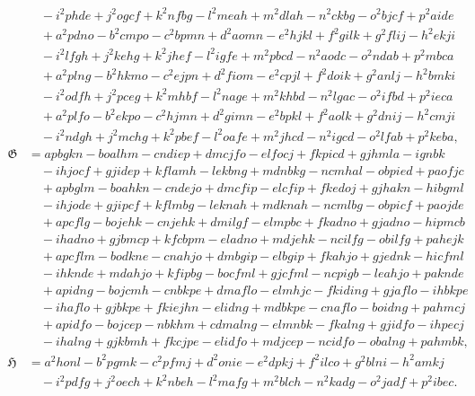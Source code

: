 \documentclass[11pt,a4paper]{article}
\theoremstyle{plain}
\theoremstyle{definition}
\theoremstyle{remark}
\begin{document}
\begin{align*}
&\quad -i^2phde + j^2ogcf + k^2nfbg - l^2meah + m^2dlah - n^2ckbg - o^2bjcf + p^2aide \\
&\quad +a^2pdno - b^2cmpo - c^2bpmn + d^2aomn - e^2hjkl + f^2gilk + g^2flij - h^2ekji \\
&\quad -i^2lfgh + j^2kehg + k^2jhef - l^2igfe + m^2pbcd - n^2aodc - o^2ndab + p^2mbca \\
&\quad +a^2plng - b^2hkmo - c^2ejpn + d^2fiom - e^2cpjl + f^2doik + g^2anlj - h^2bmki \\
&\quad -i^2odfh + j^2pceg + k^2mhbf - l^2nage + m^2khbd - n^2lgac - o^2ifbd + p^2ieca \\
&\quad +a^2plfo - b^2ekpo - c^2hjmn + d^2gimn - e^2bpkl + f^2aolk + g^2dnij - h^2cmji \\
&\quad -i^2ndgh + j^2mchg + k^2pbef - l^2oafe + m^2jhcd - n^2igcd - o^2lfab + p^2keba, \\
\mathfrak{G} &= apbgkn - boalhm - cndiep + dmcjfo - elfocj + fkpicd + gjhmla - ignbk \\
&\quad -ihjocf + gjidep + kflamh - lekbng + mdnbkg - ncmhal - obpied + paofjc \\
&\quad +apbglm - boahkn - cndejo + dmcfip - elcfip + fkedoj + gjhakn - hibgml \\
&\quad -ihjode + gjipcf + kflmbg - leknah + mdknah - ncmlbg - obpicf + paojde \\
&\quad +apcflg - bojehk - cnjehk + dmilgf - elmpbc + fkadno + gjadno - hipmcb \\
&\quad -ihadno + gjbmcp + kfcbpm - eladno + mdjehk - ncilfg - obilfg + pahejk \\
&\quad +apcflm - bodkne - cnahjo + dmbgip - elbgip + fkahjo + gjednk - hicfml \\
&\quad -ihknde + mdahjo + kfipbg - bocfml + gjcfml - ncpigb - leahjo + paknde \\
&\quad +apidng - bojcmh - cnbkpe + dmaflo - elmhjc - fkiding + gjaflo - ihbkpe \\
&\quad -ihaflo + gjbkpe + fkiejhn - elidng + mdbkpe - cnaflo - boidng + pahmcj \\
&\quad +apidfo - bojcep - nbkhm + cdmalng - elmnbk - fkalng + gjidfo - ihpecj \\
&\quad -ihalng + gjkbmh + fkcjpe - elidfo + mdjcep - ncidfo - obalng + pahmbk, \\
\mathfrak{H} &= a^2honl - b^2pgmk - c^2pfmj + d^2onie - e^2dpkj + f^2ilco + g^2blni - h^2amkj \\
&\quad -i^2pdfg + j^2oech + k^2nbeh - l^2mafg + m^2blch - n^2kadg - o^2jadf + p^2ibec.
\end{align*}
\end{document}
